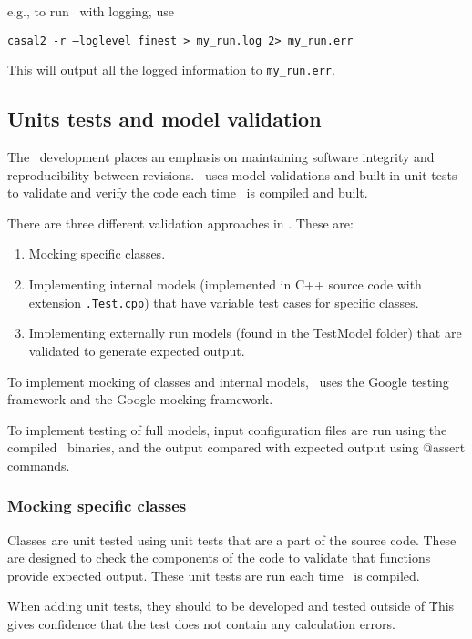 e.g., to run \CNAME\ with logging, use 

\texttt{casal2 -r --loglevel finest > my\_run.log 2> my\_run.err}

This will output all the logged information to \texttt{my\_run.err}.

\subsection{Units tests and model validation}

The \CNAME\ development places an emphasis on maintaining software integrity and reproducibility between revisions. \CNAME\ uses model validations and built in unit tests to validate and verify the code each time \CNAME\ is compiled and built. 

There are three different validation approaches in \CNAME. These are:

\begin{enumerate}
	\item Mocking specific classes.
	\item Implementing internal models (implemented in C++ source code with extension \texttt{.Test.cpp}) that have variable test cases for specific classes. 
	\item Implementing externally run models (found in the TestModel folder) that are validated to generate expected output.
\end{enumerate}

To implement mocking of classes and internal models, \CNAME\ uses the Google testing framework and the Google mocking framework.

To implement testing of full models, input configuration files are run using the compiled \CNAME\ binaries, and the output compared with expected output using @assert commands.

\subsubsection{Mocking specific classes}

Classes are unit tested using unit tests that are a part of the source code. These are designed to check the components of the code to validate that functions provide expected output. These unit tests are run each time \CNAME\ is compiled.

When adding unit tests, they should to be developed and tested outside of \CNAME\. This gives confidence that the test does not contain any calculation errors. 

